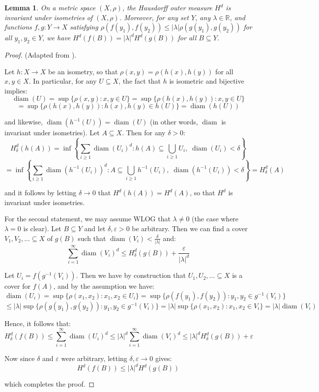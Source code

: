 \documentclass{article}[11pt]
\newcommand*{\R}{\mathbb{R}}
\DeclareMathOperator*{\diam}{diam}
\theoremstyle{dotless}
\newtheorem{lem}[thm]{Lemma}
\begin{document}
\begin{lem}\label{isom}
	On a metric space $(X, \rho)$, the Hausdorff outer measure $H^d$ is invariant under isometries of $(X, \rho)$.
	Moreover, for any set $Y$, any $\lambda \in \R$, and functions $f,g : Y \to X$ satisfying $\rho(f(y_1), f(y_2)) \leqslant |\lambda| 
	\rho(g(y_1), g(y_2))$ for all $y_1, y_2 \in Y$, we have $H^d(f(B)) = |\lambda|^d H^d(g(B))$ for all $B \subseteq Y$.
\end{lem}
\begin{proof}
	(Adapted from \cite{Fol}).
	\bigskip
	
	\noindent
	Let $h : X \to X$ be an isometry, so that $\rho(x,y) = \rho(h(x), h(y))$ for all $x,y \in X$.
	In particular, for any $U \subseteq X$, the fact that $h$ is isometric and bijective implies:
	\[ \diam(U) = \sup \{ \rho(x,y) : x,y \in U \} = \sup \{ \rho(h(x), h(y)) : x,y \in U \} \] 
	\[ = \sup \{ \rho(h(x), h(y)) : h(x),h(y) \in h(U) \} = \diam(h(U))  \]
	
	\noindent
	and likewise, $\diam(h^{-1}(U)) = \diam(U)$ (in other words, $\diam$ is invariant under isometries).
	Let $A \subseteq X$. Then for any $\delta > 0$:
	\[ H_\delta^d(h(A)) = \inf \left\{ \sum_{i \geqslant 1} \diam(U_i)^d : h(A) \subseteq \bigcup_{i \geqslant 1} U_i, \; \diam(U_i) < \delta \right\} \]
	\[ = \inf \left\{ \sum_{i \geqslant 1} \diam(h^{-1}(U_i))^d : A \subseteq \bigcup_{i \geqslant 1} h^{-1}(U_i), \; \diam(h^{-1}(U_i)) < \delta \right\}
	= H_\delta^d(A) \]
	
	\noindent
	and it follows by letting $\delta \to 0$ that $H^d(h(A)) = H^d(A)$, so that $H^d$ is invariant under isometries.
	\bigskip
	
	\noindent
	For the second statement, we may assume WLOG that $\lambda \neq 0$ (the case where $\lambda = 0$ is clear). Let $B \subseteq Y$ 
	and let $\delta, \varepsilon > 0$ be arbitrary. Then we can find a cover 
	$V_1, V_2, ... \subseteq X$ of $g(B)$ such that $\diam(V_i) < \frac{\delta}{|\lambda|}$ and:
	\[ \sum_{i=1}^\infty \diam(V_i)^d \leqslant H_\delta^d(g(B)) + \frac{\varepsilon}{|\lambda|^d} \]
	
	\noindent
	Let $U_i = f(g^{-1}(V_i))$. Then we have by construction that $U_1, U_2, ... \subseteq X$ is a cover for $f(A)$,
	and by the assumption we have:
	\[ \diam(U_i) = \sup \{ \rho(x_1, x_2) : x_1, x_2 \in U_i \} = \sup \{ \rho(f(y_1),f(y_2)) : y_1, y_2 \in g^{-1}(V_i) \}\]
	\[ \leqslant |\lambda| \sup \{ \rho(g(y_1),g(y_2)) : y_1, y_2 \in g^{-1}(V_i) \} 
	= |\lambda| \sup \{ \rho(x_1,x_2) : x_1, x_2 \in V_i \} = |\lambda| \diam(V_i) \]
	
	\noindent
	Hence, it follows that:
	\[ H_\delta^d(f(B)) \leqslant \sum_{i=1}^\infty \diam(U_i)^d \leqslant |\lambda|^d \sum_{i=1}^\infty \diam(V_i)^d
	\leqslant |\lambda|^d H_\delta^d(g(B)) + \varepsilon \]
	
	\noindent
	Now since $\delta$ and $\varepsilon$ were arbitrary, letting $\delta, \varepsilon \to 0$ gives:
	\[ H^d(f(B)) \leqslant |\lambda|^d H^d(g(B)) \]
	
	\noindent
	which completes the proof.
\end{proof}
\end{document}
